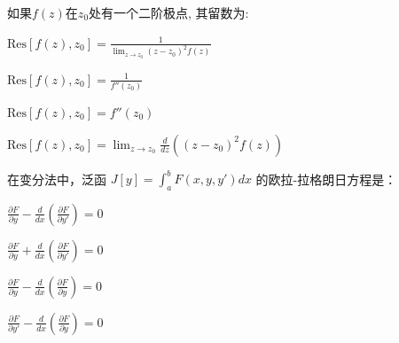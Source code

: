 \documentclass{njustexam}
\begin{document}
  


\begin{problem}
  如果$f(z)$在$z_0$处有一个二阶极点, 其留数为:
  \begin{abcd}
  \item $\text{Res}[f(z),  z_0] = \frac{1}{\lim_{z \to z_0} (z - z_0)^2 f(z)}$
  \item $\text{Res}[f(z),  z_0] = \frac{1}{f''(z_0)}$
  \item $\text{Res}[f(z),  z_0] = f''(z_0)$
  \item $\text{Res}[f(z),  z_0] = \lim_{z \to z_0} \frac{d}{dz} \left( (z - z_0)^2 f(z) \right)$
  \end{abcd}
  \end{problem}







\begin{problem}
  在变分法中，泛函 $J[y] = \int_{a}^{b} F(x, y, y') dx$ 的欧拉-拉格朗日方程是：
  \begin{abcd}
  \item $\frac{\partial F}{\partial y} - \frac{d}{dx} \left( \frac{\partial F}{\partial y'} \right) = 0$
  \item $\frac{\partial F}{\partial y} + \frac{d}{dx} \left( \frac{\partial F}{\partial y'} \right) = 0$
  \item $\frac{\partial F}{\partial y} - \frac{d}{dx} \left( \frac{\partial F}{\partial y} \right) = 0$
  \item $\frac{\partial F}{\partial y'} - \frac{d}{dx} \left( \frac{\partial F}{\partial y} \right) = 0$
  \end{abcd}
  \end{problem}



   
\end{document}
